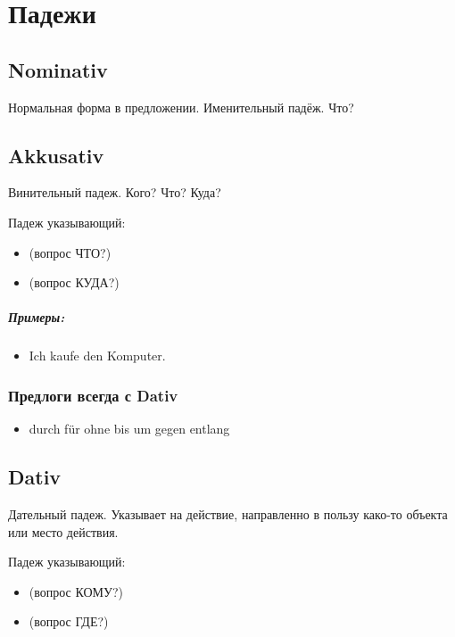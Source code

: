 \chapter{Падежи}

\section{Nominativ}

Нормальная форма в предложении. Именительный падёж. Что?

\section{Akkusativ}

Винительный падеж. Кого? Что? Куда?

Падеж указывающий:
\begin{itemize}
 \item {} (вопрос ЧТО?)
 \item {} (вопрос КУДА?)
\end{itemize}

\paragraph{Примеры:}
\begin{itemize}
\item Ich kaufe den Komputer.
~\\ 
\end{itemize}

\subsection{Предлоги всегда с Dativ}
\begin{itemize}
\item  durch für ohne bis um gegen entlang 
\end{itemize}

\section{Dativ}

Дательный падеж. Указывает на действие, направленно в пользу како-то объекта или место действия.

Падеж указывающий:
\begin{itemize}
 \item {} (вопрос КОМУ?)
 \item {} (вопрос ГДЕ?)
\end{itemize}

